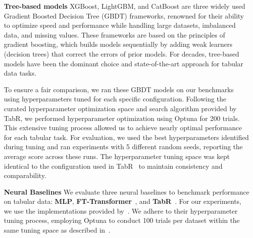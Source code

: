 


\textbf{Tree-based models} XGBoost, LightGBM, and CatBoost are three widely used Gradient Boosted Decision Tree (GBDT) frameworks, renowned for their ability to optimize speed and performance while handling large datasets, imbalanced data, and missing values. These frameworks are based on the principles of gradient boosting, which builds models sequentially by adding weak learners (decision trees) that correct the errors of prior models. For decades, tree-based models have been the dominant choice and state-of-the-art approach for tabular data tasks.

To ensure a fair comparison, we ran these GBDT models on our benchmarks using hyperparameters tuned for each specific configuration. Following the curated hyperparameter optimization space and search algorithm provided by TabR, we performed hyperparameter optimization using Optuna for 200 trials. This extensive tuning process allowed us to achieve nearly optimal performance for each tabular task. For evaluation, we used the best hyperparameters identified during tuning and ran experiments with 5 different random seeds, reporting the average score across these runs. The hyperparameter tuning space was kept identical to the configuration used in TabR~\citep{gorishniy2024TabR} to maintain consistency and comparability.

\textbf{Neural Baselines}
We evaluate three neural baselines to benchmark performance on tabular data: \textbf{MLP}, \textbf{FT-Transformer}~\citep{gorishniy2021revisit_tab_dnn}, and \textbf{TabR}~\citep{gorishniy2024TabR}. For our experiments, we use the implementations provided by~\citep{gorishniy2024TabR}. We adhere to their hyperparameter tuning process, employing Optuna to conduct 100 trials per dataset within the same tuning space as described in~\citep{gorishniy2024TabR}.

